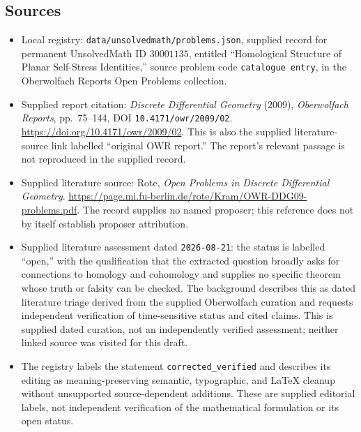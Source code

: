 \documentclass[11pt]{article}
\begin{document}
\subsection{Sources}
\begin{itemize}
\item Local registry: \texttt{data/unsolvedmath/problems.json}, supplied record for permanent UnsolvedMath ID \(30001135\), entitled ``Homological Structure of Planar Self-Stress Identities,'' source problem code \texttt{catalogue entry}, in the Oberwolfach Reports Open Problems collection.
\item Supplied report citation: \emph{Discrete Differential Geometry} (2009), \emph{Oberwolfach Reports}, pp.~75--144, DOI \texttt{10.4171/owr/2009/02}. \url{https://doi.org/10.4171/owr/2009/02}. This is also the supplied literature-source link labelled ``original OWR report.'' The report's relevant passage is not reproduced in the supplied record.
\item Supplied literature source: Rote, \emph{Open Problems in Discrete Differential Geometry}. \url{https://page.mi.fu-berlin.de/rote/Kram/OWR-DDG09-problems.pdf}. The record supplies no named proposer; this reference does not by itself establish proposer attribution.
\item Supplied literature assessment dated \texttt{2026-08-21}: the status is labelled ``open,'' with the qualification that the extracted question broadly asks for connections to homology and cohomology and supplies no specific theorem whose truth or falsity can be checked. The background describes this as dated literature triage derived from the supplied Oberwolfach curation and requests independent verification of time-sensitive status and cited claims. This is supplied dated curation, not an independently verified assessment; neither linked source was visited for this draft.
\item The registry labels the statement \texttt{corrected\_verified} and describes its editing as meaning-preserving semantic, typographic, and LaTeX cleanup without unsupported source-dependent additions. These are supplied editorial labels, not independent verification of the mathematical formulation or its open status.
\end{itemize}
\end{document}
